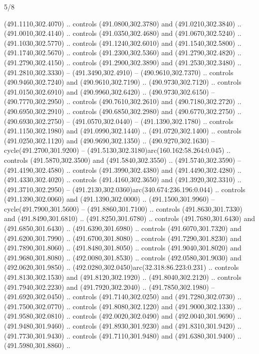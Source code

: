\begin{flagdescription}{5/8}
\begin{scope}[xshift=0.5\flaglength,yshift=0.5\flagwidth,scale=\flagwidth/475.63]
\begin{scope}[y=0.8pt, x=0.8pt, yscale=-1, xscale=1,shift={(-450,-300)}]
\begin{scope}[cm={{1.0,0.0,0.0,1.0,(-0.0002,0.12556)}},cm={{1.0,0.0,0.0,1.0,(0.00179,0.0)}}]
\begin{scope}[cm={{1.11592,0.0,0.0,1.11592,(-106.89933,-41.77764)}}]
\begin{scope}[draw=black,fill=cfff]
\begin{scope}[fill=black]
  (491.1110,302.4070) .. controls (491.0800,302.3780) and (491.0210,302.3840) ..
  (491.0010,302.4140) .. controls (491.0350,302.4680) and (491.0670,302.5240) ..
  (491.1030,302.5770) .. controls (491.1240,302.6010) and (491.1540,302.5800) ..
  (491.1740,302.5670) .. controls (491.2300,302.5360) and (491.2790,302.4820) ..
  (491.2790,302.4150) .. controls (491.2900,302.3890) and (491.2530,302.3480) ..
  (491.2810,302.3330) -- (491.3490,302.4910) -- (490.9610,302.7370) .. controls
  (490.9460,302.7240) and (490.9610,302.7190) .. (490.9730,302.7120) .. controls
  (491.0150,302.6910) and (490.9960,302.6420) .. (490.9730,302.6150) --
  (490.7770,302.2950) .. controls (490.7610,302.2610) and (490.7180,302.2720) ..
  (490.6950,302.2910) .. controls (490.6850,302.2980) and (490.6770,302.2750) ..
  (490.6930,302.2750) -- (491.0570,302.0440) -- (491.1390,302.1780) .. controls
  (491.1150,302.1980) and (491.0990,302.1440) .. (491.0720,302.1400) .. controls
  (491.0250,302.1120) and (490.9690,302.1350) .. (490.9270,302.1630) --
  cycle(491.2700,301.9200) -- (491.5130,302.3180)arc(160.162:58.264:0.045) ..
  controls (491.5870,302.3500) and (491.5840,302.3550) .. (491.5740,302.3590) --
  (491.4190,302.4580) .. controls (491.3990,302.4380) and (491.4490,302.4280) ..
  (491.4330,302.4020) .. controls (491.4160,302.3650) and (491.3920,302.3310) ..
  (491.3710,302.2950) -- (491.2130,302.0360)arc(340.674:236.196:0.044) ..
  controls (491.1390,302.0060) and (491.1390,302.0000) .. (491.1500,301.9960) --
  cycle(491.7900,301.5600) -- (491.8860,301.7100) .. controls
  (491.8630,301.7330) and (491.8490,301.6810) .. (491.8250,301.6780) .. controls
  (491.7680,301.6430) and (491.6850,301.6430) .. (491.6390,301.6980) .. controls
  (491.6070,301.7320) and (491.6200,301.7990) .. (491.6700,301.8080) .. controls
  (491.7290,301.8230) and (491.7890,301.8060) .. (491.8480,301.8050) .. controls
  (491.9040,301.8020) and (491.9680,301.8080) .. (492.0080,301.8530) .. controls
  (492.0580,301.9030) and (492.0620,301.9850) ..
  (492.0280,302.0450)arc(32.318:86.223:0.231) .. controls (491.8130,302.1530)
  and (491.8120,302.1920) .. (491.8040,302.2120) .. controls (491.7940,302.2230)
  and (491.7920,302.2040) .. (491.7850,302.1980) -- (491.6920,302.0450) ..
  controls (491.7140,302.0250) and (491.7280,302.0730) .. (491.7500,302.0770) ..
  controls (491.8080,302.1220) and (491.9000,302.1330) .. (491.9580,302.0810) ..
  controls (492.0020,302.0490) and (492.0040,301.9690) .. (491.9480,301.9460) ..
  controls (491.8930,301.9230) and (491.8310,301.9420) .. (491.7730,301.9430) ..
  controls (491.7110,301.9480) and (491.6380,301.9400) .. (491.5980,301.8860) ..

\end{scope}
\end{scope}
\end{scope}
\end{scope}
\end{scope}
\end{scope}
\end{flagdescription}
